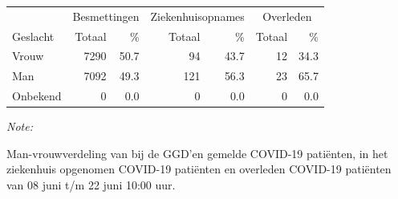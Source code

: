 \documentclass[
  english,
  man,floatsintext]{apa6}
\begin{document}
\begin{table}
\centering\begingroup\fontsize{11}{13}\selectfont

\begin{threeparttable}
\begin{tabular}{lrrrrrr}
\toprule
\multicolumn{1}{c}{ } & \multicolumn{2}{c}{Besmettingen} & \multicolumn{2}{c}{Ziekenhuisopnames} & \multicolumn{2}{c}{Overleden} \\
\cmidrule(l{3pt}r{3pt}){2-3} \cmidrule(l{3pt}r{3pt}){4-5} \cmidrule(l{3pt}r{3pt}){6-7}
Geslacht & Totaal & \% & Totaal & \% & Totaal & \%\\
\midrule
Vrouw & 7290 & 50.7 & 94 & 43.7 & 12 & 34.3\\
Man & 7092 & 49.3 & 121 & 56.3 & 23 & 65.7\\
Onbekend & 0 & 0.0 & 0 & 0.0 & 0 & 0.0\\
\bottomrule
\end{tabular}
\begin{tablenotes}
\item \textit{Note: } 
\item Man-vrouwverdeling van bij de GGD’en gemelde COVID-19 patiënten, in het ziekenhuis opgenomen COVID-19 patiënten en overleden COVID-19 patiënten van 08 juni t/m 22 juni 10:00 uur.
\end{tablenotes}
\end{threeparttable}
\endgroup{}
\end{table}
\newpage
\end{document}
